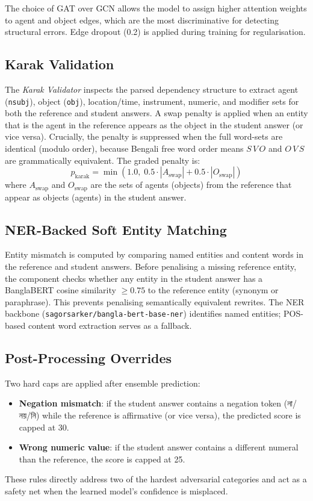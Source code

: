 \documentclass[11pt]{article}
\newcommand{\bn}[1]{{\bengalifont #1}}
\begin{document}
The choice of GAT over GCN allows the model to assign higher attention weights to agent and object edges, which are the most discriminative for detecting structural errors. Edge dropout (0.2) is applied during training for regularisation.

\subsection{Karak Validation}

The \emph{Karak Validator} inspects the parsed dependency structure to extract agent (\texttt{nsubj}), object (\texttt{obj}), location/time, instrument, numeric, and modifier sets for both the reference and student answers. A swap penalty is applied when an entity that is the agent in the reference appears as the object in the student answer (or vice versa). Crucially, the penalty is suppressed when the full word-sets are identical (modulo order), because Bengali free word order means $S\,V\,O$ and $O\,V\,S$ are grammatically equivalent. The graded penalty is:
\begin{equation}
  p_\mathrm{karak} = \min\!\left(1.0,\; 0.5 \cdot |A_\mathrm{swap}| + 0.5 \cdot |O_\mathrm{swap}|\right)
\end{equation}
where $A_\mathrm{swap}$ and $O_\mathrm{swap}$ are the sets of agents (objects) from the reference that appear as objects (agents) in the student answer.

\subsection{NER-Backed Soft Entity Matching}

Entity mismatch is computed by comparing named entities and content words in the reference and student answers. Before penalising a missing reference entity, the component checks whether any entity in the student answer has a BanglaBERT cosine similarity $\geq 0.75$ to the reference entity (synonym or paraphrase). This prevents penalising semantically equivalent rewrites. The NER backbone (\texttt{sagorsarker/bangla-bert-base-ner}) identifies named entities; POS-based content word extraction serves as a fallback.

\subsection{Post-Processing Overrides}

Two hard caps are applied after ensemble prediction:
\begin{itemize}
  \item \textbf{Negation mismatch}: if the student answer contains a negation token (\bn{না/নয়/নি}) while the reference is affirmative (or vice versa), the predicted score is capped at 30.
  \item \textbf{Wrong numeric value}: if the student answer contains a different numeral than the reference, the score is capped at 25.
\end{itemize}
These rules directly address two of the hardest adversarial categories and act as a safety net when the learned model's confidence is misplaced.
\end{document}
